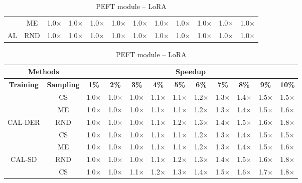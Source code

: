 \begin{table}[htbp]
\begin{subtable}{\linewidth}
\begin{tabular}{c|c|cccccccccc}
 & ME & 1.0$\times$ & 1.0$\times$ & 1.0$\times$ & 1.0$\times$ & 1.0$\times$ & 1.0$\times$ & 1.0$\times$ & 1.0$\times$ & 1.0$\times$ & 1.0$\times$\\

\multirow{-3}{*}{\raggedright\arraybackslash AL} & RND & 1.0$\times$ & 1.0$\times$ & 1.0$\times$ & 1.0$\times$ & 1.0$\times$ & 1.0$\times$ & 1.0$\times$ & 1.0$\times$ & 1.0$\times$ & 1.0$\times$\\
\bottomrule
\end{tabular}
\end{subtable}
\vspace{1em}
\begin{subtable}{\linewidth}
\centering
\caption{PEFT module -- LoRA}

\begin{tabular}{c|c|cccccccccc}
\toprule
\multicolumn{2}{c|}{\textbf{Methods}} & \multicolumn{10}{c}{\textbf{Speedup}} \\
\midrule
\textbf{Training} & \textbf{Sampling} & \textbf{1\%} & \textbf{2\%} & \textbf{3\%} & \textbf{4\%} & \textbf{5\%} & \textbf{6\%} & \textbf{7\%} & \textbf{8\%} & \textbf{9\%} & \textbf{10\%}\\
\midrule
 & CS & 1.0$\times$ & 1.0$\times$ & 1.0$\times$ & 1.1$\times$ & 1.1$\times$ & 1.2$\times$ & 1.3$\times$ & 1.4$\times$ & 1.5$\times$ & 1.5$\times$\\

 & ME & 1.0$\times$ & 1.0$\times$ & 1.0$\times$ & 1.1$\times$ & 1.1$\times$ & 1.2$\times$ & 1.3$\times$ & 1.4$\times$ & 1.5$\times$ & 1.6$\times$\\

\multirow{-3}{*}{\raggedright\arraybackslash CAL-DER} & RND & 1.0$\times$ & 1.0$\times$ & 1.0$\times$ & 1.1$\times$ & 1.2$\times$ & 1.3$\times$ & 1.4$\times$ & 1.5$\times$ & 1.6$\times$ & 1.8$\times$\\
\midrule
 & CS & 1.0$\times$ & 1.0$\times$ & 1.0$\times$ & 1.1$\times$ & 1.1$\times$ & 1.2$\times$ & 1.3$\times$ & 1.4$\times$ & 1.5$\times$ & 1.5$\times$\\

 & ME & 1.0$\times$ & 1.0$\times$ & 1.0$\times$ & 1.1$\times$ & 1.1$\times$ & 1.2$\times$ & 1.3$\times$ & 1.4$\times$ & 1.5$\times$ & 1.6$\times$\\

\multirow{-3}{*}{\raggedright\arraybackslash CAL-SD} & RND & 1.0$\times$ & 1.0$\times$ & 1.0$\times$ & 1.1$\times$ & 1.2$\times$ & 1.3$\times$ & 1.4$\times$ & 1.5$\times$ & 1.6$\times$ & 1.8$\times$\\
\midrule
 & CS & 1.0$\times$ & 1.0$\times$ & 1.1$\times$ & 1.2$\times$ & 1.3$\times$ & 1.4$\times$ & 1.5$\times$ & 1.6$\times$ & 1.7$\times$ & 1.8$\times$\\


\end{tabular}
\end{subtable}
\end{table}
